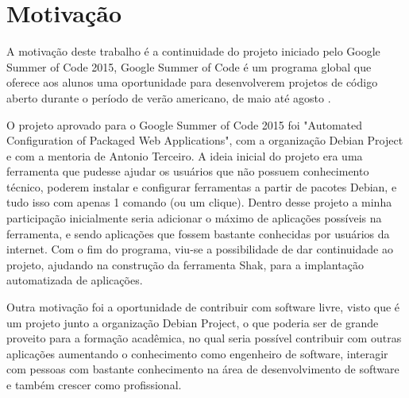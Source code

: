 \section{Motivação}
\label{sec:motivacao}
A motivação deste trabalho é a continuidade do projeto iniciado pelo Google Summer
of Code 2015, Google Summer of Code é um programa global que oferece aos
alunos uma oportunidade para desenvolverem projetos de código aberto durante o período
de verão americano, de maio até agosto \cite{gsoc2015}.

O projeto aprovado para o Google Summer of Code 2015 foi "Automated Configuration
of Packaged Web Applications", com a organização Debian Project e com a mentoria de
Antonio Terceiro. A ideia inicial do projeto era uma ferramenta que
pudesse ajudar os usuários que não possuem conhecimento técnico, poderem
instalar e configurar ferramentas a partir de pacotes Debian, e tudo isso com
apenas 1 comando (ou um clique). Dentro desse projeto a minha participação
inicialmente seria adicionar o máximo de aplicações possíveis na ferramenta,
e sendo aplicações que fossem bastante conhecidas por usuários da internet. Com o
 fim do programa, viu-se a possibilidade de dar continuidade ao projeto, ajudando
na construção da ferramenta Shak, para a implantação automatizada de aplicações.

Outra motivação foi a oportunidade de contribuir com software livre, visto que é
um projeto junto a organização Debian Project, o que poderia ser de grande proveito
para a formação acadêmica, no qual seria possível contribuir com outras
aplicações aumentando o conhecimento como engenheiro de software, interagir com
pessoas com bastante conhecimento na área de desenvolvimento de software e também
crescer como profissional.
